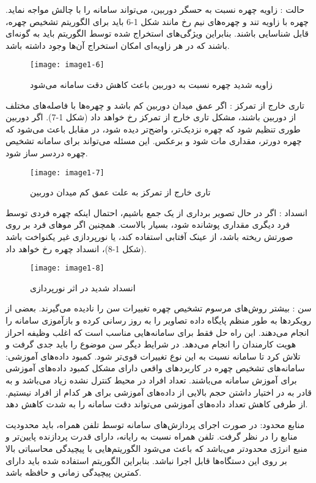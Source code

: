 حالت : زاویه چهره نسبت به حسگر دوربین، می‌تواند سامانه را با چالش مواجه نماید. چهره با زاویه تند و چهره‌های نیم رخ مانند شکل 1-6 باید برای الگوریتم تشخیص چهره، قابل شناسایی باشند. بنابراین ویژگی‌های استخراج شده توسط الگوریتم باید به گونه‌ای باشند که در هر زاویه‌ای امکان استخراج آن‌ها وجود داشته باشد.
\begin{figure}[!h]
\centering
\texttt{[image: image1-6]}
\caption{زاویه شدید چهره نسبت به دوربین باعث کاهش دقت سامانه می‌شود \cite{ref13}}\label{image1-6}
\end{figure}

تاری خارج از تمرکز : اگر عمق میدان دوربین کم باشد و چهره‌ها با فاصله‌های مختلف از دوربین باشند، مشکل تاری خارج از تمرکز رخ خواهد داد (شکل 1-7). اگر دوربین طوری تنظیم شود که چهره نزدیک‌تر، واضح‌تر دیده شود، در مقابل باعث می‌شود که چهره دورتر، مقداری مات شود و برعکس. این مسئله می‌تواند برای سامانه تشخیص چهره دردسر ساز شود.
\begin{figure}[!h]
\centering
\texttt{[image: image1-7]}
\caption{تاری خارج از تمرکز به علت عمق کم میدان دوربین \cite{ref13}}\label{image1-7}
\end{figure}

انسداد : اگر در حال تصویر برداری از یک جمع باشیم، احتمال اینکه چهره فردی توسط فرد دیگری مقداری پوشانده شود، بسیار بالاست. همچنین اگر موهای فرد بر روی صورتش ریخته باشد، از عینک آفتابی استفاده کند، یا نورپردازی غیر یکنواخت باشد (شکل 1-8)، انسداد چهره رخ خواهد داد.
\begin{figure}[!h]
\centering
\texttt{[image: image1-8]}
\caption{انسداد شدید در اثر نورپردازی \cite{ref13}}\label{image1-8}
\end{figure}

سن : بیشتر روش‌های مرسوم تشخیص چهره تغییرات سن را نادیده می‌گیرند. بعضی از رویکردها به طور منظم پایگاه داده تصاویر را به روز رسانی کرده و بازآموزی سامانه را انجام می‌دهند. این راه حل فقط برای سامانه‌هایی مناسب است که اغلب وظیفه احراز هویت کارمندان را انجام می‌دهد. در شرایط دیگر سن موضوع را باید جدی گرفت و تلاش کرد تا سامانه نسبت به این نوع تغییرات قوی‌تر شود.
کمبود داده‌های آموزشی: سامانه‌های تشخیص چهره در کاربردهای واقعی دارای مشکل کمبود داده‌های آموزشی برای آموزش سامانه می‌باشند. تعداد افراد در محیط کنترل نشده زیاد می‌باشد و به قادر به در اختیار داشتن حجم بالایی از داده‌های آموزشی برای هر کدام از افراد نیستیم. از طرفی کاهش تعداد داده‌های آموزشی می‌تواند دقت سامانه را به شدت کاهش دهد. 

منابع محدود: در صورت اجرای پردازش‌های سامانه توسط تلفن همراه، باید محدودیت منابع را در نظر گرفت. تلفن همراه نسبت به رایانه، دارای قدرت پردازنده پایین‌تر و منبع انرژی محدودتر می‌باشد که باعث می‌شود الگوریتم‌هایی با پیچیدگی محاسباتی بالا بر روی این دستگاه‌ها قابل اجرا نباشد. بنابراین الگوریتم استفاده شده باید دارای کمترین پیچیدگی زمانی و حافظه باشد.

